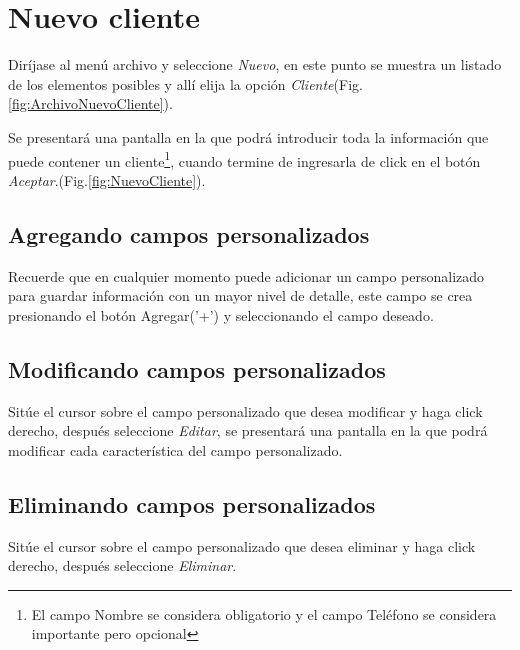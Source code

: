 \section{Nuevo cliente}
\label{sec:nuevoCliente}
Dir\'ijase al men\'u archivo y seleccione \emph{Nuevo}, en este punto se muestra un listado de los elementos posibles y
all\'i elija la opci\'on \emph{Cliente}(Fig.\ref{fig:ArchivoNuevoCliente}). 
  

Se presentar\'a una pantalla en la que podr\'a introducir toda la informaci\'on
que puede contener un cliente\footnote{El campo Nombre se considera obligatorio y el campo Tel\'efono se
considera importante pero opcional},
cuando termine de ingresarla de click en el bot\'on \emph{Aceptar}.(Fig.\ref{fig:NuevoCliente}). 
  

\subsection{Agregando campos personalizados}
\label{sec:agregarCamposCliente}
Recuerde que en cualquier momento puede adicionar un campo personalizado para guardar informaci\'on con un mayor nivel de detalle, este campo se crea presionando el bot\'on Agregar('+') y seleccionando el campo deseado.

\subsection{Modificando campos personalizados}
\label{sec:modificarCamposCliente}
Sit\'ue el cursor sobre el campo personalizado que desea modificar y haga click derecho, despu\'es seleccione \emph{Editar},
se presentar\'a una pantalla en la que podr\'a modificar cada caracter\'istica
del campo personalizado.

\subsection{Eliminando campos personalizados}
\label{sec:eliminarCamposCliente}
Sit\'ue el cursor sobre el campo personalizado que desea eliminar y haga click derecho, despu\'es seleccione \emph{Eliminar}.





